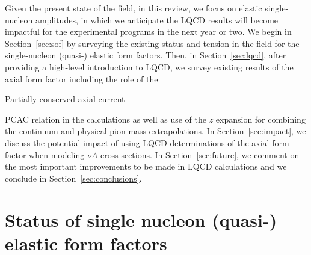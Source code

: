 \documentclass{ar-1col}
\begin{document}
Given the present state of the field, in this review, we focus on elastic single-nucleon amplitudes, in which we anticipate the LQCD results will become impactful for the experimental programs in the next year or two.
We begin in Section~\ref{sec:sof} by surveying the existing status and tension in the field for the single-nucleon (quasi-) elastic form factors.
Then, in Section~\ref{sec:lqcd}, after providing a high-level introduction to LQCD, we survey existing results of the axial form factor including the role of the%
\begin{marginnote}
  {Partially-conserved} axial current
\end{marginnote}%
PCAC relation in the calculations as well as use of the $z$ expansion for combining the continuum and physical pion mass extrapolations.
In Section~\ref{sec:impact}, we discuss the potential impact of using LQCD determinations of the axial form factor when modeling $\nu A$ cross sections.
In Section~\ref{sec:future}, we comment on the most important improvements to be made in LQCD calculations and we conclude in Section~\ref{sec:conclusions}.


\section{Status of single nucleon (quasi-) elastic form factors\label{sec:sof}}
\end{document}
